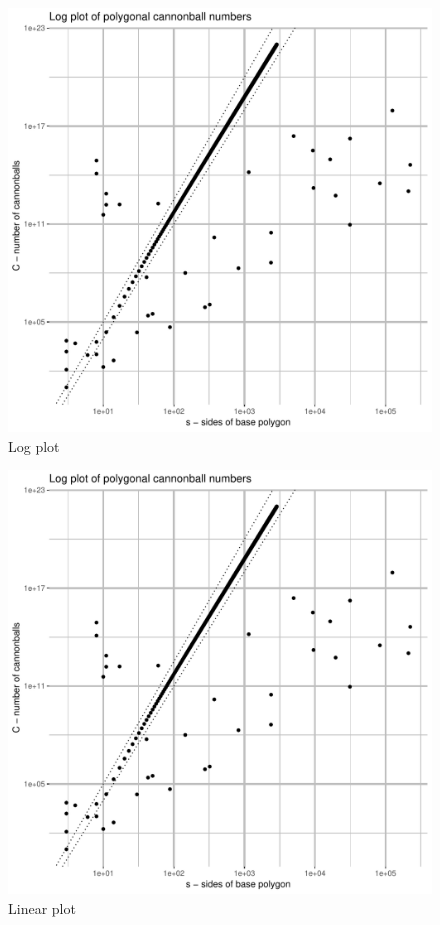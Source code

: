 \begin{figure}[H]
\centering
\includegraphics[width=\textwidth,page=1]{../graph/Rplots.pdf}
\caption{Log plot}
\label{fig_log}
\end{figure}

\begin{figure}[H]
\centering
\includegraphics[width=\textwidth,page=2]{../graph/Rplots.pdf}
\caption{Linear plot}
\label{fig_lin}
\end{figure}

